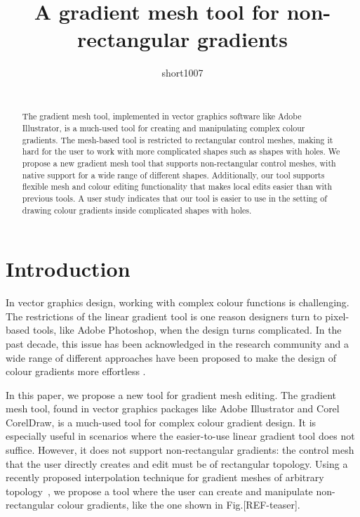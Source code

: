 \documentclass{egpubl}
\title[Non-rectangular gradient mesh tool]
	{A gradient mesh tool for non-rectangular gradients}
\author[short1007]
{\parbox{\textwidth}{\centering short1007}
        \\
	{\parbox{\textwidth}{\centering } }
}
\begin{document}

\maketitle

\begin{abstract}
The gradient mesh tool, implemented in vector graphics software like Adobe Illustrator, is a much-used tool for creating and manipulating complex colour gradients. The mesh-based tool is restricted to rectangular control meshes, making it hard for the user to work with more complicated shapes such as shapes with holes. We propose a new gradient mesh tool that supports non-rectangular control meshes, with native support for a wide range of different shapes. Additionally, our tool supports flexible mesh and colour editing functionality that makes local edits easier than with previous tools. A user study indicates that our tool is easier to use in the setting of drawing colour gradients inside complicated shapes with holes.

\begin{classification} %
\end{classification}

\end{abstract}

\section{Introduction}
\label{sec:intro}

In vector graphics design, working with complex colour functions is challenging. The restrictions of the linear gradient tool is one reason designers turn to pixel-based tools, like Adobe Photoshop, when the design turns complicated. In the past decade, this issue has been acknowledged in the research community and a wide range of different approaches have been proposed to make the design of colour gradients more effortless \cite{Orzan:2008,Lopez-Moreno:2013}.

In this paper, we propose a new tool for gradient mesh editing. The gradient mesh tool, found in vector graphics packages like Adobe Illustrator and Corel CorelDraw, is a much-used tool for complex colour gradient design. It is especially useful in scenarios where the easier-to-use linear gradient tool does not suffice. However, it does not support non-rectangular gradients: the control mesh that the user directly creates and edit must be of rectangular topology. Using a recently proposed interpolation technique for gradient meshes of arbitrary topology~\cite{Lieng:2016}, we propose a tool where the user can create and manipulate non-rectangular colour gradients, like the one shown in Fig.[REF-teaser].
\end{document}
